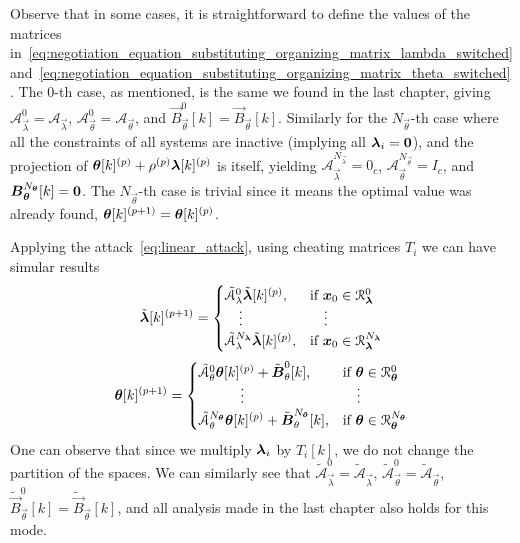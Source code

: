 \documentclass[../main.tex]{subfiles}
\begin{document}
Observe that in some cases, it is straightforward to define the values of the matrices in~\eqref{eq:negotiation_equation_substituting_organizing_matrix_lambda_switched} and~\eqref{eq:negotiation_equation_substituting_organizing_matrix_theta_switched}.
The $0$-th case, as mentioned, is the same we found in the last chapter, giving
$\mathcal{A}_{\vec{\lambda}}^{0}=\mathcal{A}_{\vec{\lambda}}$,
$\mathcal{A}_{\vec{\theta}}^{0}=\mathcal{A}_{\vec{\theta}}$, and
$\vec{B}_{\vec{\theta}}^{0}[k]=\vec{B}_{\vec{\theta}}[k]$.
Similarly for the $N_{\vec{\theta}}$-th case where all the constraints of all systems are inactive (implying all $\boldsymbol{\lambda}_{i}=\mathbf{0}$), and the projection of $\boldsymbol{\theta}[k]^{(p)}+\rho^{(p)}\boldsymbol{\lambda}[k]^{(p)}$ is itself, yielding
$\mathcal{A}_{\vec{\lambda}}^{N_{\vec{\lambda}}}=0_{c}$,
$\mathcal{A}_{\vec{\theta}}^{N_{\vec{\theta}}}=I_{c}$, and
$\boldsymbol{B}_{\boldsymbol{\theta}}^{N_{\boldsymbol{\theta}}}[k]=\mathbf{0}$.
The $N_{\vec{\theta}}$-th case is trivial since it means the optimal value was already found, $\boldsymbol{\theta}[k]^{(p+1)}=\boldsymbol{\theta}[k]^{(p)}$.

Applying the attack~\eqref{eq:linear_attack}, using cheating matrices $T_{i}$ we can have simular results
\begin{equation}
  \label{eq:negotiation_equation_substituting_organizing_matrix_lambda_switched_cheating}
  \tilde{\vec{\lambda}}[k]\pplusone=
  \begin{cases}
    \tilde{\mathcal{A}}_{\lambda}^{0}\tilde{\vec{\lambda}}[k]\p,&\text{if}\ \vec{x}_{0}\in\set{R}_{\vec{\lambda}}^{0}\\
    \quad\vdots&\quad\vdots\\
    \tilde{\mathcal{A}}_{\lambda}^{N_{\vec{\lambda}}}\tilde{\vec{\lambda}}[k]\p,&\text{if}\ \vec{x}_{0}\in\set{R}_{\vec{\lambda}}^{N_{\vec{\lambda}}}\\
  \end{cases}
\end{equation}
\begin{equation}
  \label{eq:negotiation_equation_substituting_organizing_matrix_theta_switched_cheating}
  \vec{\theta}[k]\pplusone=
  \begin{cases}
    \tilde{\mathcal{A}}_{\theta}^{0}\vec{\theta}[k]\p+\mathcal{\tilde{\vec{B}}}_{\theta}^{0}[k],&\text{if}\ \vec{\theta}\in\set{R}_{\vec{\theta}}^{0}\\
    \qquad\quad \vdots&\quad \vdots\\
    \tilde{\mathcal{A}}_{\theta}^{N_{\vec{\theta}}}\vec{\theta}[k]\p+\mathcal{\tilde{\vec{B}}}_{\theta}^{N_{\vec{\theta}}}[k],&\text{if}\ \vec{\theta}\in\set{R}_{\vec{\theta}}^{N_{\vec{\theta}}}\\
  \end{cases}
\end{equation}
One can observe that since we multiply $\boldsymbol{\lambda}_{i}$ by $T_{i}[k]$, we do not change the partition of the spaces.
We can similarly see that
$\tilde{\mathcal{A}}_{\vec{\lambda}}^{0}=\tilde{\mathcal{A}}_{\vec{\lambda}}$,
$\tilde{\mathcal{A}}_{\vec{\theta}}^{0}=\tilde{\mathcal{A}}_{\vec{\theta}}$,
$\tilde{\vec{B}}_{\vec{\theta}}^{0}[k]=\tilde{\vec{B}}_{\vec{\theta}}[k]$, and all analysis made in the last chapter also holds for this mode.
\end{document}
